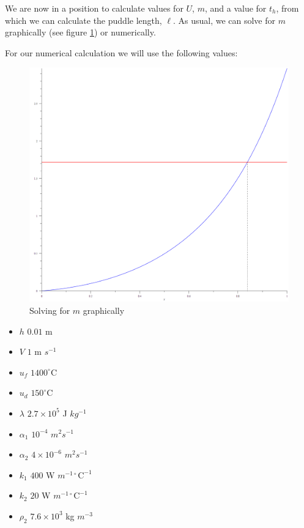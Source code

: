 \documentclass{report}
\begin{document}
We are now in a position to calculate values for $U$, $m$, and a value for $t_h$, from which we can 
calculate the puddle length, $\ell$. As usual, we can solve for $m$ graphically (see figure 
\ref{fig:m-solved-cc}) or numerically.\bigskip

For our numerical calculation we will use the following values:\bigskip

\begin{figure}[t]
\centering
\includegraphics[scale = 0.15]{m-solved-cc}
\caption{Solving for $m$ graphically}
\label{fig:m-solved-cc}
\end{figure}

\begin{itemize}

\item $h$        \tab $0.01$ m

\item $V$        \tab $1$ m $s^{-1}$

\item $u_f$      \tab $1400^{\circ}\mathrm{C}$ 

\item $u_d$      \tab $150^{\circ}\mathrm{C}$ 

\item $\lambda$  \tab $2.7 \times 10^5$ J $kg^{-1}$

\item $\alpha_1$ \tab $10^{-4}$ $m^2 s^{-1}$

\item $\alpha_2$ \tab $4 \times 10^{-6}$ $m^2 s^{-1}$

\item $k_1$      \tab $400$ W $m^{-1 \circ}\mathrm{C}^{-1}$

\item $k_2$      \tab $20$ W $m^{-1 \circ}\mathrm{C}^{-1}$

\item $\rho_2$   \tab $7.6 \times 10^3$ kg $m^{-3}$

\end{itemize}\medskip
\end{document}
